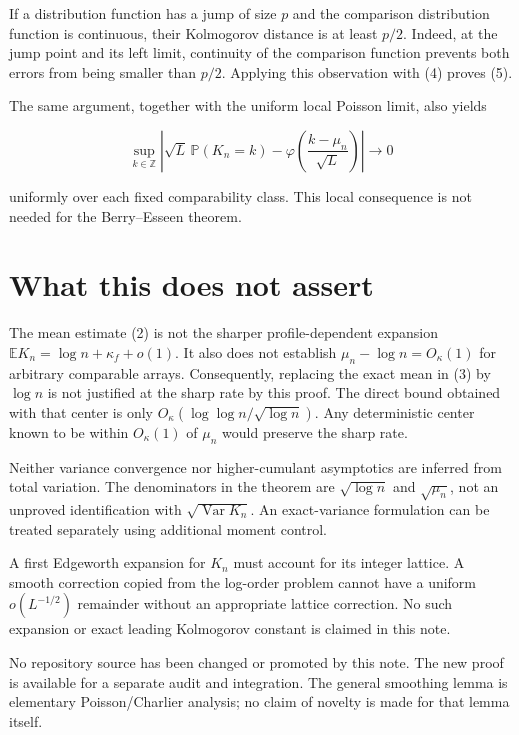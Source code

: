 \documentclass[
  11pt,
]{article}
\begin{document}
If a distribution function has a jump of size \(p\) and the comparison
distribution function is continuous, their Kolmogorov distance is at
least \(p/2\). Indeed, at the jump point and its left limit, continuity
of the comparison function prevents both errors from being smaller than
\(p/2\). Applying this observation with (4) proves (5).

The same argument, together with the uniform local Poisson limit, also
yields

\[
 \sup_{k\in\mathbb Z}
 \left|\sqrt L\,\mathbb P(K_n=k)
 -\varphi\!\left(\frac{k-\mu_n}{\sqrt L}\right)\right|
 \longrightarrow0
\tag{37}
\]

uniformly over each fixed comparability class. This local consequence is
not needed for the Berry--Esseen theorem.

\section{What this does not assert}\label{what-this-does-not-assert}

The mean estimate (2) is not the sharper profile-dependent expansion
\(\mathbb EK_n=\log n+\kappa_f+o(1)\). It also does not establish
\(\mu_n-\log n=O_\kappa(1)\) for arbitrary comparable arrays.
Consequently, replacing the exact mean in (3) by \(\log n\) is not
justified at the sharp rate by this proof. The direct bound obtained
with that center is only \(O_\kappa(\log\log n/\sqrt{\log n})\). Any
deterministic center known to be within \(O_\kappa(1)\) of \(\mu_n\)
would preserve the sharp rate.

Neither variance convergence nor higher-cumulant asymptotics are
inferred from total variation. The denominators in the theorem are
\(\sqrt{\log n}\) and \(\sqrt{\mu_n}\), not an unproved identification
with \(\sqrt{\operatorname{Var}K_n}\). An exact-variance formulation can
be treated separately using additional moment control.

A first Edgeworth expansion for \(K_n\) must account for its integer
lattice. A smooth correction copied from the log-order problem cannot
have a uniform \(o(L^{-1/2})\) remainder without an appropriate lattice
correction. No such expansion or exact leading Kolmogorov constant is
claimed in this note.

No repository source has been changed or promoted by this note. The new
proof is available for a separate audit and integration. The general
smoothing lemma is elementary Poisson/Charlier analysis; no claim of
novelty is made for that lemma itself.
\end{document}
